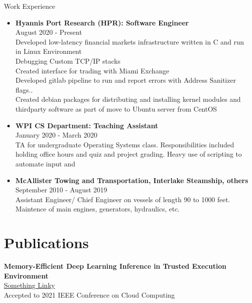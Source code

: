 \documentclass[10pt,a4paper]{article}
\begin{document}
{
\begin{tcolorbox}
  {\selectfont
    \LARGE{Work Experience}
  }

\end{tcolorbox}

\begin{tcolorbox}

  \begin{itemize}
  \item
    {
      \textbf{Hyannis Port Research (HPR): Software Engineer} \\
      August 2020 - Present \\
      Developed low-latency financial markets infrastructure written in C and run in Linux Environment \\
      Debugging Custom TCP/IP stacks \\
      Created interface for trading with Miami Exchange \\
      Developed gitlab pipeline to run and report errors with Address Sanitizer flags.. \\
      Created debian packages for distributing and installing kernel modules and thirdparty software as part of move to Ubuntu server from CentOS
    }

  \item
    {
      \textbf{WPI CS Department: Teaching Assistant} \\
      January 2020 - March 2020 \\
      TA for undergraduate Operating Systems class. Responsibilities included holding office hours and quiz and project grading. Heavy use of scripting to automate input and
    }

  \item
    {
      \textbf{McAllister Towing and Transportation, Interlake Steamship, others} \\
      September 2010 - August 2019 \\
      Assistant Engineer/ Chief Engineer on vessels of length 90 to 1000 feet. Maintence of main engines, generators, hydraulics, etc.
    }
  \end{itemize}



  \section*{Publications}
  \textbf{Memory-Efficient Deep Learning Inference in Trusted Execution Environment} \\
  \href{http://arxiv-export-lb.library.cornell.edu/abs/2104.15109?context=cs.LG}{Something Linky} \\
  Accepted to 2021 IEEE Conference on Cloud Computing \\


\end{tcolorbox}}
\end{document}
